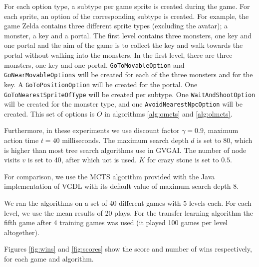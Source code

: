 For each option type, a subtype per game sprite is created during the game. For
each sprite, an option of the corresponding subtype is created. For example, the
game Zelda contains three different sprite types (excluding the avatar); a
monster, a key and a portal. The first level contains three monsters, one key
and one portal and the aim of the game is to collect the key and walk towards
the portal without walking into the monsters. In the first level, there are
three monsters, one key and one portal. \texttt{GoToMovableOption} and
\texttt{GoNearMovableOptions} will be created for each of the three monsters and
for the key. A \texttt{GoToPositionOption} will be created for the portal.
One \texttt{GoToNearestSpriteOfType} will be created per subtype. One
\texttt{WaitAndShootOption} will be created for the monster type, and one
\texttt{AvoidNearestNpcOption} will be
created. This set of options is $O$ in algorithms \ref{alg:omcts} and
\ref{alg:olmcts}.

Furthermore, in these experiments we use discount factor $\gamma = 0.9$,
maximum action time $t = 40$ milliseconds. The maximum search depth $d$
is set to 80, which is higher than most tree search algorithms use in GVGAI. The
number of node visits $v$ is set to 40, after which \textsf{uct} is used. $K$
for crazy stone is set to $0.5$.

For comparison, we use the MCTS algorithm provided with the Java implementation
of VGDL with its default value of maximum search depth 8. 

We ran the algorithms on a set of 40 different games with 5 levels each. For
each level, we use the mean results of 20 plays. For the transfer learning
algorithm the fifth game after 4 training games was used (it played 100
games per level altogether).


Figures \ref{fig:wins} and \ref{fig:scores} show the score and number of wins
respectively, for each game and algorithm. 

